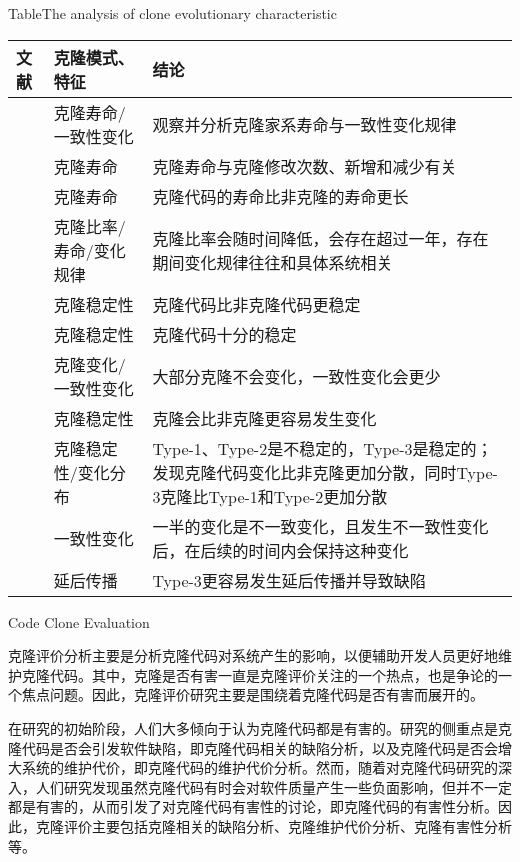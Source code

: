 \begin{table}[htbp]
\centering
{}
{Table$\!$}{The analysis of clone evolutionary characteristic}
\vspace{0.5em}
\wuhao
\begin{tabularx}{0.9\textwidth}{llX}
\toprule[1.5pt]
文献&克隆模式、特征&结论\\
\midrule[1pt]
\cite{kim2005empirical}&	克隆寿命/一致性变化	&观察并分析克隆家系寿命与一致性变化规律\\
\cite{cai2011empirical}&	克隆寿命&	克隆寿命与克隆修改次数、新增和减少有关\\
\cite{krinke2011cloned}&	克隆寿命&	克隆代码的寿命比非克隆的寿命更长\\
\cite{bazrafshan2012evolution}\cite{gode2009evolution}&	克隆比率/寿命/变化规律	&克隆比率会随时间降低，会存在超过一年，存在期间变化规律往往和具体系统相关\\
\hline
\cite{krinke2008cloned}&克隆稳定性&	克隆代码比非克隆代码更稳定\\
\cite{gode2011clone}\cite{harder2013cloned}&	克隆稳定性&	克隆代码十分的稳定\\
\cite{gode2011frequency}&	克隆变化/一致性变化&	大部分克隆不会变化，一致性变化会更少\\
\cite{rahman2014change}&	克隆稳定性&	克隆会比非克隆更容易发生变化\\
\cite{mondal2012comparative}\cite{mondal2012dispersion}&	克隆稳定性/变化分布&	Type-1、Type-2是不稳定的，Type-3是稳定的；发现克隆代码变化比非克隆更加分散，同时Type-3克隆比Type-1和Type-2更加分散\\
\hline
\cite{krinke2007study}&	一致性变化&	一半的变化是不一致变化，且发生不一致性变化后，在后续的时间内会保持这种变化\\
\cite{mondal2016comparative}&	延后传播&	Type-3更容易发生延后传播并导致缺陷\\
\bottomrule[1.5pt]
\end{tabularx}
\end{table}



{Code Clone Evaluation}

克隆评价分析主要是分析克隆代码对系统产生的影响，以便辅助开发人员更好地维护克隆代码。其中，克隆是否有害一直是克隆评价关注的一个热点，也是争论的一个焦点问题。因此，克隆评价研究主要是围绕着克隆代码是否有害而展开的。

在研究的初始阶段，人们大多倾向于认为克隆代码都是有害的。研究的侧重点是克隆代码是否会引发软件缺陷，即克隆代码相关的缺陷分析，以及克隆代码是否会增大系统的维护代价，即克隆代码的维护代价分析。然而，随着对克隆代码研究的深入，人们研究发现虽然克隆代码有时会对软件质量产生一些负面影响，但并不一定都是有害的，从而引发了对克隆代码有害性的讨论，即克隆代码的有害性分析。因此，克隆评价主要包括克隆相关的缺陷分析、克隆维护代价分析、克隆有害性分析等。

